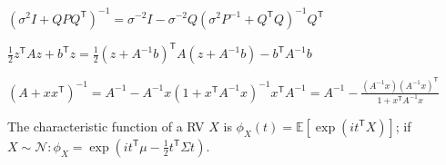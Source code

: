 \documentclass[11pt,landscape,a4paper,fleqn]{article}
\newcommand*{\tran}{^{\mathsf{T}}} %
\begin{document}
\begin{multicols*}{4}
\((\sigma^2 I + Q P Q\tran)^{-1} = \sigma^{-2} I - \sigma^{-2} Q(\sigma^2 P^{-1} + Q\tran Q)^{-1} Q\tran\)

\(\frac{1}{2}z\tran Az + b\tran z = \frac{1}{2}(z + A^{-1}b)\tran A (z + A^{-1}b) - b\tran A^{-1} b\)

\((A + x x\tran)^{-1} = A^{-1} - A^{-1}x(1 + x\tran A^{-1}x)^{-1} x\tran A^{-1} = A^{-1} - \frac{(A^{-1}x)(A^{-1}x)\tran}{1 + x\tran A^{-1}x}\)

The characteristic function of a RV \(X\) is \(\phi_X(t) = \mathbb{E}[\exp(it\tran X)]\);
if \(X \sim \mathcal{N} : \phi_X = \exp(it\tran \mu - \frac{1}{2} t\tran \Sigma t)\).

\end{multicols*}
\end{document}
